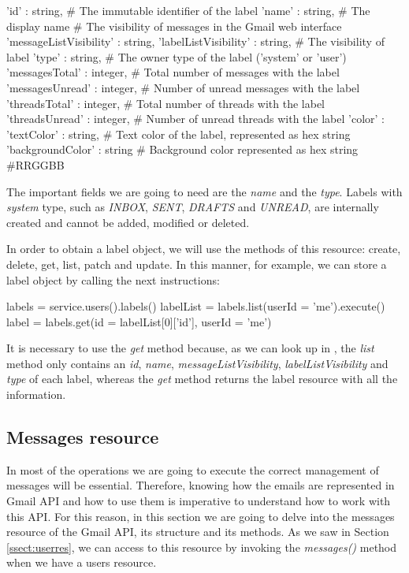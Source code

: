 \begin{python}
{
'id' : string, # The immutable identifier of the label
'name' : string, # The display name
# The visibility of messages in the Gmail web interface
'messageListVisibility' : string,
'labelListVisibility' : string, # The visibility of label
'type' : string, # The owner type of the label ('system' or 'user')
'messagesTotal' : integer, # Total number of messages with the label
'messagesUnread' : integer, # Number of unread messages with the label
'threadsTotal' : integer, # Total number of threads with the label
'threadsUnread' : integer, # Number of unread threads with the label
'color' : {
	'textColor' : string, # Text color of the label, represented as hex string
	'backgroundColor' : string # Background color represented as hex string #RRGGBB
	}
}
\end{python}

The important fields we are going to need are the \textit{name} and the \textit{type}. Labels with \textit{system} type, such as \textit{INBOX}, \textit{SENT}, \textit{DRAFTS} and \textit{UNREAD}, are internally created and cannot be added, modified or deleted.

In order to obtain a label object, we will use the methods of this resource: create, delete, get, list, patch and update. In this manner, for example, we can store a label object by calling the next instructions:

\begin{python}
labels = service.users().labels()
labelList = labels.list(userId = 'me').execute()
label = labels.get(id = labelList[0]['id'], userId = 'me')
\end{python}

It is necessary to use the \textit{get} method because, as we can look up in \cite[/v1/reference/users/labels/list]{gmailAPI}, the \textit{list} method only contains an \textit{id}, \textit{name}, \textit{messageListVisibility}, \textit{labelListVisibility} and \textit{type} of each label, whereas the \textit{get} method returns the label resource with all the information.

\subsection{Messages resource}\label{ssect:msgres}
In most of the operations we are going to execute the correct management of messages will be essential. Therefore, knowing how the emails are represented in Gmail API and how to use them is imperative to understand how to work with this API. For this reason, in this section we are going to delve into the messages resource of the Gmail API, its structure and its methods. As we saw in Section \ref{ssect:userres}, we can access to this resource by invoking the \textit{messages()} method when we have a users resource.

